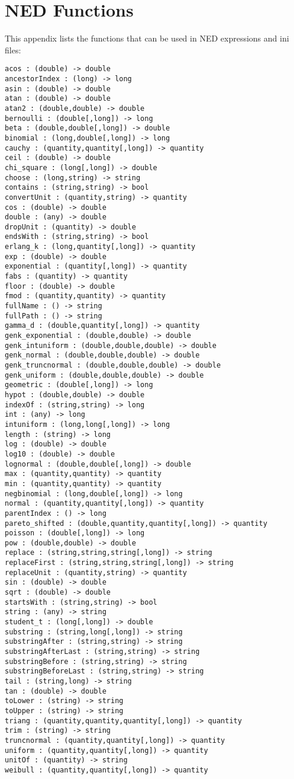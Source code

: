 \chapter{NED Functions}
\label{cha:ned-functions}

This appendix lists the functions that can be used in NED
expressions and ini files:

%
%


\begin{verbatim}
acos : (double) -> double
ancestorIndex : (long) -> long
asin : (double) -> double
atan : (double) -> double
atan2 : (double,double) -> double
bernoulli : (double[,long]) -> long
beta : (double,double[,long]) -> double
binomial : (long,double[,long]) -> long
cauchy : (quantity,quantity[,long]) -> quantity
ceil : (double) -> double
chi_square : (long[,long]) -> double
choose : (long,string) -> string
contains : (string,string) -> bool
convertUnit : (quantity,string) -> quantity
cos : (double) -> double
double : (any) -> double
dropUnit : (quantity) -> double
endsWith : (string,string) -> bool
erlang_k : (long,quantity[,long]) -> quantity
exp : (double) -> double
exponential : (quantity[,long]) -> quantity
fabs : (quantity) -> quantity
floor : (double) -> double
fmod : (quantity,quantity) -> quantity
fullName : () -> string
fullPath : () -> string
gamma_d : (double,quantity[,long]) -> quantity
genk_exponential : (double,double) -> double
genk_intuniform : (double,double,double) -> double
genk_normal : (double,double,double) -> double
genk_truncnormal : (double,double,double) -> double
genk_uniform : (double,double,double) -> double
geometric : (double[,long]) -> long
hypot : (double,double) -> double
indexOf : (string,string) -> long
int : (any) -> long
intuniform : (long,long[,long]) -> long
length : (string) -> long
log : (double) -> double
log10 : (double) -> double
lognormal : (double,double[,long]) -> double
max : (quantity,quantity) -> quantity
min : (quantity,quantity) -> quantity
negbinomial : (long,double[,long]) -> long
normal : (quantity,quantity[,long]) -> quantity
parentIndex : () -> long
pareto_shifted : (double,quantity,quantity[,long]) -> quantity
poisson : (double[,long]) -> long
pow : (double,double) -> double
replace : (string,string,string[,long]) -> string
replaceFirst : (string,string,string[,long]) -> string
replaceUnit : (quantity,string) -> quantity
sin : (double) -> double
sqrt : (double) -> double
startsWith : (string,string) -> bool
string : (any) -> string
student_t : (long[,long]) -> double
substring : (string,long[,long]) -> string
substringAfter : (string,string) -> string
substringAfterLast : (string,string) -> string
substringBefore : (string,string) -> string
substringBeforeLast : (string,string) -> string
tail : (string,long) -> string
tan : (double) -> double
toLower : (string) -> string
toUpper : (string) -> string
triang : (quantity,quantity,quantity[,long]) -> quantity
trim : (string) -> string
truncnormal : (quantity,quantity[,long]) -> quantity
uniform : (quantity,quantity[,long]) -> quantity
unitOf : (quantity) -> string
weibull : (quantity,quantity[,long]) -> quantity
\end{verbatim}

